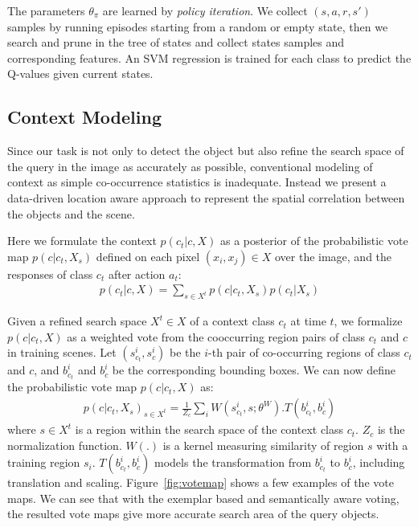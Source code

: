 The parameters $\theta_\pi$ are learned by \textit{policy iteration}. We collect $(s,a,r,s')$ samples by running episodes starting from a random or empty state, then we search and prune in the tree of states and collect states samples  and corresponding features. An SVM regression is trained for each class to predict the Q-values given current states.

\subsection{Context Modeling}
\label{sec:context}
Since our task is not only to detect the object but also refine the search space of the query in the image as accurately as possible, conventional modeling of context as simple co-occurrence statistics is inadequate. Instead we present a data-driven location aware approach to represent the spatial correlation between the objects and the scene. 

Here we formulate the context $p(c_t|c,X)$ as a posterior of the probabilistic vote map $p(c|c_t,X_s)$ defined on each pixel $(x_i,x_j)\in X$ over the image, and the responses of class $c_t$ after action $a_t$:
\begin{eqnarray}
p(c_t|c,X) = \sum_{s\in X^t} p(c|c_t,X_s)p(c_t|X_s)
\end{eqnarray}

Given a refined search space $X^t\in X$ of a context class $c_t$ at time $t$, we formalize $p(c|c_t,X)$ as a weighted vote from the cooccurring region pairs of class $c_t$ and $c$ in training scenes. Let $(s_{c_t}^i, s_c^i)$ be the $i$-th pair of co-occurring regions of class $c_t$ and $c$, and $b_{c_t}^i$ and $b_c^i$ be the corresponding bounding boxes. We can now define the probabilistic vote map $p(c|c_t,X)$ as:
\begin{eqnarray}
\label{eq:votemap}
p(c|c_t,X_s)_{s\in X^t} = \frac{1}{Z_c}\sum_i W(s_{c_t}^i,s;\theta^W).T(b_{c_t}^i,b_c^i)
\end{eqnarray}
where $s\in X^t$ is a region within the search space of the context class $c_t$. $Z_c$ is the normalization function. $W(.)$ is a kernel measuring similarity of region $s$ with a training region $s_i$. $T(b_{c_t}^i,b_c^i)$ models the transformation from $b_{c_t}^i$ to $b_c^i$, including translation and scaling. Figure~\ref{fig:votemap} shows a few examples of the vote maps. We can see that with the exemplar based and semantically aware voting, the resulted vote maps give more accurate search area of the query objects.


